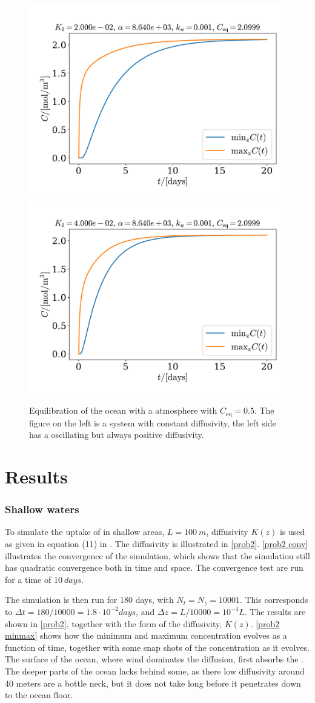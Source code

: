 \documentclass{article}
\begin{document}
    \begin{figure}
        \centering
        \includegraphics[width=.49\textwidth]{../plots/test5_minmax}
        \includegraphics[width=.49\textwidth]{../plots/test5_varK_minmax}
        \caption{Equilibration of the ocean with a atmosphere with $C_\mathrm{eq}=0.5$. The figure on the left is a system with constant diffusivity, the left side has a oscillating but always positive diffusivity.}
        \label{minmax}
    \end{figure}

    \section*{Results}
    \subsubsection*{Shallow waters}

    To simulate the uptake of  in shallow areas, $L=\SI{100}{m}$, diffusivity $K(z)$ is used as given in equation (11) in \cite{exercise}. The diffusivity is illustrated in \autoref{prob2}. \autoref{prob2 conv} illustrates the convergence of the simulation, which shows that the simulation still has quadratic convergence both in time and space. The convergence test are run for a time of $\SI{10}{days}$.

    The simulation is then run for 180 days, with $N_t = N_z = 10001$. This corresponds to $\Delta t = 180 / 10000 = 1.8 \cdot 10^{-2} \si{days}$, and $\Delta z = L/10000 = 10^{-4} L$. The results are shown in \autoref{prob2}, together with the form of the diffusivity, $K(z)$. \autoref{prob2 minmax} shows how the minimum and maximum concentration evolves as a function of time, together with some snap shots of the concentration as it evolves. The surface of the ocean, where wind dominates the diffusion, first absorbs the . The deeper parts of the ocean lacks behind some, as there low diffusivity around 40 meters are a bottle neck, but it does not take long before it penetrates down to the ocean floor.
\end{document}
